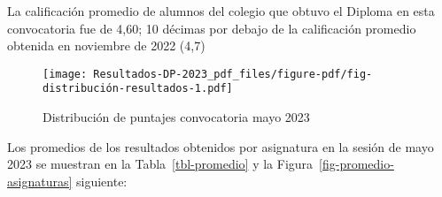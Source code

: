 \documentclass[
  letterpaper,
  DIV=11,
  numbers=noendperiod]{scrartcl}
\begin{document}
La calificación promedio de alumnos del colegio que obtuvo el Diploma en
esta convocatoria fue de 4,60; 10 décimas por debajo de la calificación
promedio obtenida en noviembre de 2022 (4,7)

\begin{figure}

{\centering \texttt{[image: Resultados-DP-2023\_pdf\_files/figure-pdf/fig-distribución-resultados-1.pdf]}

}

\caption{\label{fig-distribución-resultados}Distribución de puntajes
convocatoria mayo 2023}

\end{figure}

Los promedios de los resultados obtenidos por asignatura en la sesión de
mayo 2023 se muestran en la Tabla~\ref{tbl-promedio} y la
Figura~\ref{fig-promedio-asignaturas} siguiente:
\end{document}
